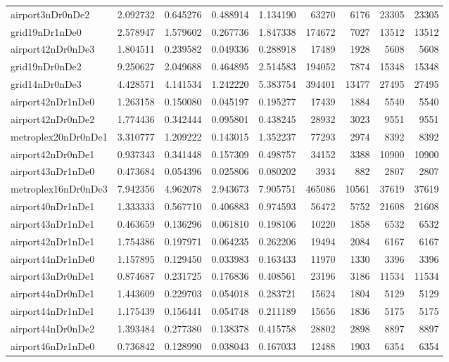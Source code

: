 \begin{longtable}{|l|r|r|r|r|r|r|r|r|}
airport3nDr0nDe2 & 2.092732 & 0.645276 & 0.488914 & 1.134190 & 63270 & 6176 & 23305 & 23305 \\
grid19nDr1nDe0 & 2.578947 & 1.579602 & 0.267736 & 1.847338 & 174672 & 7027 & 13512 & 13512 \\
airport42nDr0nDe3 & 1.804511 & 0.239582 & 0.049336 & 0.288918 & 17489 & 1928 & 5608 & 5608 \\
grid19nDr0nDe2 & 9.250627 & 2.049688 & 0.464895 & 2.514583 & 194052 & 7874 & 15348 & 15348 \\
grid14nDr0nDe3 & 4.428571 & 4.141534 & 1.242220 & 5.383754 & 394401 & 13477 & 27495 & 27495 \\
airport42nDr1nDe0 & 1.263158 & 0.150080 & 0.045197 & 0.195277 & 17439 & 1884 & 5540 & 5540 \\
airport42nDr0nDe2 & 1.774436 & 0.342444 & 0.095801 & 0.438245 & 28932 & 3023 & 9551 & 9551 \\
metroplex20nDr0nDe1 & 3.310777 & 1.209222 & 0.143015 & 1.352237 & 77293 & 2974 & 8392 & 8392 \\
airport42nDr0nDe1 & 0.937343 & 0.341448 & 0.157309 & 0.498757 & 34152 & 3388 & 10900 & 10900 \\
airport43nDr1nDe0 & 0.473684 & 0.054396 & 0.025806 & 0.080202 & 3934 & 882 & 2807 & 2807 \\
metroplex16nDr0nDe3 & 7.942356 & 4.962078 & 2.943673 & 7.905751 & 465086 & 10561 & 37619 & 37619 \\
airport40nDr1nDe1 & 1.333333 & 0.567710 & 0.406883 & 0.974593 & 56472 & 5752 & 21608 & 21608 \\
airport43nDr1nDe1 & 0.463659 & 0.136296 & 0.061810 & 0.198106 & 10220 & 1858 & 6532 & 6532 \\
airport42nDr1nDe1 & 1.754386 & 0.197971 & 0.064235 & 0.262206 & 19494 & 2084 & 6167 & 6167 \\
airport44nDr1nDe0 & 1.157895 & 0.129450 & 0.033983 & 0.163433 & 11970 & 1330 & 3396 & 3396 \\
airport43nDr0nDe1 & 0.874687 & 0.231725 & 0.176836 & 0.408561 & 23196 & 3186 & 11534 & 11534 \\
airport44nDr0nDe1 & 1.443609 & 0.229703 & 0.054018 & 0.283721 & 15624 & 1804 & 5129 & 5129 \\
airport44nDr1nDe1 & 1.175439 & 0.156441 & 0.054748 & 0.211189 & 15656 & 1836 & 5175 & 5175 \\
airport44nDr0nDe2 & 1.393484 & 0.277380 & 0.138378 & 0.415758 & 28802 & 2898 & 8897 & 8897 \\
airport46nDr1nDe0 & 0.736842 & 0.128990 & 0.038043 & 0.167033 & 12488 & 1903 & 6354 & 6354 \\

\end{longtable}

